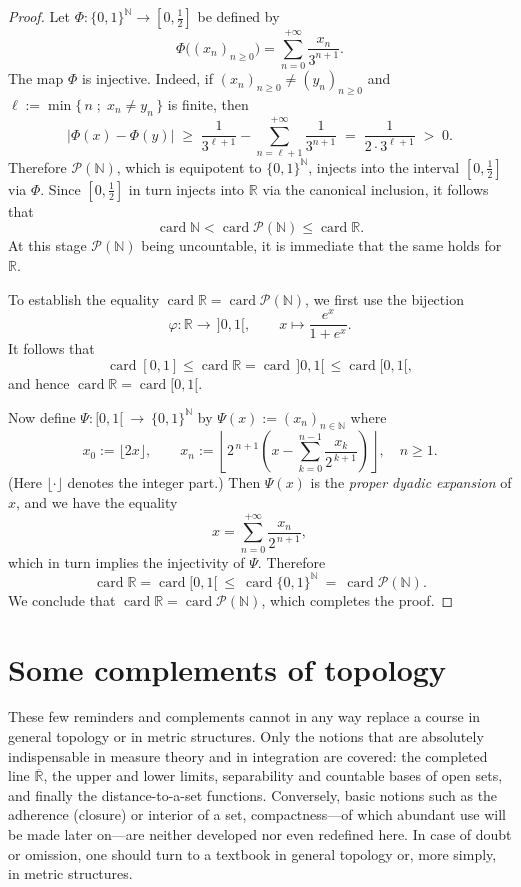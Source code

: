 \documentclass[11pt]{article}
\theoremstyle{definition}
\begin{document}
\begin{proof}
Let $\Phi:\{0,1\}^{\mathbb N}\longrightarrow [0,\tfrac12]$ be defined by
\[
\Phi\bigl((x_n)_{n\ge 0}\bigr)=\sum_{n=0}^{+\infty}\frac{x_n}{3^{n+1}}.
\]
The map $\Phi$ is injective.
Indeed, if $(x_n)_{n\ge 0}\ne (y_n)_{n\ge 0}$ and $\ell:=\min\{\,n\;;\; x_n\ne y_n\,\}$ is finite, then
\[
\bigl|\Phi(x)-\Phi(y)\bigr|
\;\ge\;
\frac{1}{3^{\ell+1}}-\sum_{n=\ell+1}^{+\infty}\frac{1}{3^{n+1}}
\;=\;
\frac{1}{2\cdot3^{\ell+1}}
\;>\;0.
\]
Therefore $\mathcal P(\mathbb N)$, which is equipotent to $\{0,1\}^{\mathbb N}$, injects into the interval $[0,\tfrac12]$ via $\Phi$.
Since $[0,\tfrac12]$ in turn injects into $\mathbb R$ via the canonical inclusion, it follows that
\[
\operatorname{card}\mathbb N < \operatorname{card}\mathcal P(\mathbb N)\le \operatorname{card}\mathbb R.
\]
At this stage $\mathcal P(\mathbb N)$ being uncountable, it is immediate that the same holds for $\mathbb R$.

To establish the equality $\operatorname{card}\mathbb R=\operatorname{card}\mathcal P(\mathbb N)$, we first use the bijection
\[
\varphi:\mathbb R\longrightarrow\,]0,1[,\qquad
x\longmapsto \frac{e^x}{1+e^x}.
\]
It follows that
\[
\operatorname{card}[0,1]\le \operatorname{card}\mathbb R=\operatorname{card}\,]0,1[\,\le \operatorname{card}[0,1[,
\]
and hence $\operatorname{card}\mathbb R=\operatorname{card}[0,1[$.

Now define $\Psi:[0,1[\ \longrightarrow\ \{0,1\}^{\mathbb N}$ by $\Psi(x):=(x_n)_{n\in\mathbb N}$ where
\[
x_0:=\lfloor 2x\rfloor,\qquad
x_n:=\left\lfloor 2^{\,n+1}\!\left(x-\sum_{k=0}^{n-1}\frac{x_k}{2^{\,k+1}}\right)\right\rfloor,\quad n\ge 1.
\]
(Here $\lfloor\cdot\rfloor$ denotes the integer part.)
Then $\Psi(x)$ is the \emph{proper dyadic expansion} of $x$, and we have the equality
\[
x=\sum_{n=0}^{+\infty}\frac{x_n}{2^{\,n+1}},
\]
which in turn implies the injectivity of $\Psi$.
Therefore
\[
\operatorname{card}\mathbb R=\operatorname{card}[0,1[\ \le\ \operatorname{card}\{0,1\}^{\mathbb N}\ =\ \operatorname{card}\mathcal P(\mathbb N).
\]
We conclude that $\operatorname{card}\mathbb R=\operatorname{card}\mathcal P(\mathbb N)$, which completes the proof.
\end{proof}

\newpage
\section{Some complements of topology}

These few reminders and complements cannot in any way replace a course in general topology or in metric structures.
Only the notions that are absolutely indispensable in measure theory and in integration are covered:
the completed line $\overline{\mathbb{R}}$, the upper and lower limits, separability and countable bases of open sets, and finally the distance-to-a-set functions.
Conversely, basic notions such as the adherence (closure) or interior of a set, compactness—of which abundant use will be made later on—are neither developed nor even redefined here.
In case of doubt or omission, one should turn to a textbook in general topology or, more simply, in metric structures.
\end{document}
